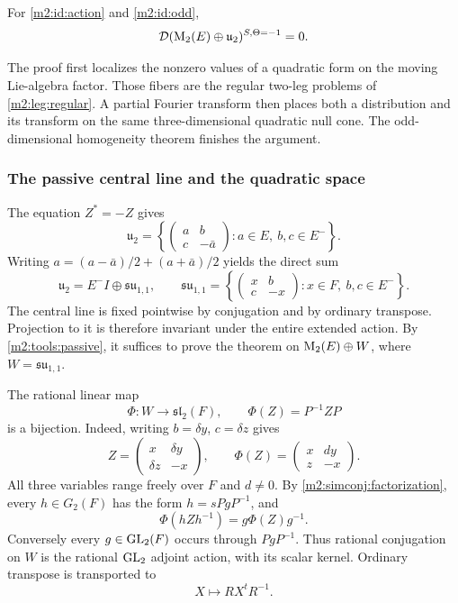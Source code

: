 \begin{theorem}\label{m2:id:vanishing}
For \eqref{m2:id:action} and \eqref{m2:id:odd},
\[
 \mathcal D(\operatorname{M}_2(E)\oplus\mathfrak u_2)^{S,\Theta=-1}=0.
\]
\end{theorem}

The proof first localizes the nonzero values of a quadratic form on
the moving Lie-algebra factor. Those fibers are the regular two-leg
problems of \cref{m2:leg:regular}. A partial Fourier transform then
places both a distribution and its transform on the same
three-dimensional quadratic null cone. The odd-dimensional
homogeneity theorem finishes the argument.

\subsubsection{The passive central line and the quadratic space}

The equation $Z^*=-Z$ gives
\[
 \mathfrak u_2=
 \left\{\begin{pmatrix}a&b\\c&-\bar a\end{pmatrix}:
          a\in E,\ b,c\in E^-\right\}.
\]
Writing $a=(a-\bar a)/2+(a+\bar a)/2$ yields the direct sum
\begin{equation}\label{m2:id:lie-splitting}
 \mathfrak u_2=E^-I\oplus\mathfrak{su}_{1,1},\qquad
 \mathfrak{su}_{1,1}=
 \left\{\begin{pmatrix}x&b\\c&-x\end{pmatrix}:
          x\in F,\ b,c\in E^-\right\}.
\end{equation}
The central line is fixed pointwise by conjugation and by ordinary
transpose. Projection to it is therefore invariant under the entire
extended action. By \cref{m2:tools:passive}, it suffices to prove the
theorem on $\operatorname{M}_2(E)\oplus W$, where
$W=\mathfrak{su}_{1,1}$.

The rational linear map
\begin{equation}\label{m2:id:sl2-map}
 \Phi:W\longrightarrow\mathfrak{sl}_2(F),\qquad
                  \Phi(Z)=P^{-1}ZP
\end{equation}
is a bijection. Indeed, writing $b=\delta y$, $c=\delta z$ gives
\[
 Z=\begin{pmatrix}x&\delta y\\\delta z&-x\end{pmatrix},
 \qquad \Phi(Z)=\begin{pmatrix}x&dy\\z&-x\end{pmatrix}.
\]
All three variables range freely over $F$ and $d\ne0$.
By \cref{m2:simconj:factorization}, every $h\in G_2(F)$ has the form
$h=sPgP^{-1}$, and
\[
 \Phi(hZh^{-1})=g\Phi(Z)g^{-1}.
\]
Conversely every $g\in\operatorname{GL}_2(F)$ occurs through $PgP^{-1}$.
Thus rational conjugation on $W$ is the rational $\operatorname{GL}_2$ adjoint
action, with its scalar kernel. Ordinary transpose
is transported to
\begin{equation}\label{m2:id:transported-transpose}
 X\longmapsto RX^tR^{-1}.
\end{equation}


